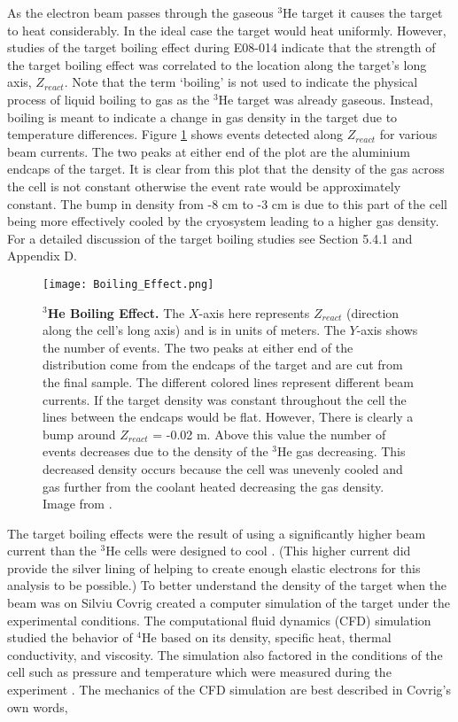 As the electron beam passes through the gaseous $^3$He target it causes the target to heat considerably. In the ideal case the target would heat uniformly. However, studies of the target boiling effect during E08-014 indicate that the strength of the target boiling effect was correlated to the location along the target's long axis, $Z_{react}$. Note that the term `boiling' is not used to indicate the physical process of liquid boiling to gas as the $^3$He target was already gaseous. Instead, boiling is meant to indicate a change in gas density in the target due to temperature differences. Figure \ref{fig:boiling_effect} shows events detected along $Z_{react}$ for various beam currents. The two peaks at either end of the plot are the aluminium endcaps of the target. It is clear from this plot that the density of the gas across the cell is not constant otherwise the event rate would be approximately constant. The bump in density from -8 cm to -3 cm is due to this part of the cell being more effectively cooled by the cryosystem leading to a higher gas density. For a detailed discussion of the target boiling studies see \cite{Thesis:Ye} Section 5.4.1 and Appendix D. 

\begin{figure}[!ht]
\begin{center}
\texttt{[image: Boiling\_Effect.png]}
\end{center}
\caption[$^3$He Boiling Effect]{
{\bf{$^3$He Boiling Effect.}} The $X$-axis here represents $Z_{react}$ (direction along the cell's long axis) and is in units of meters. The $Y$-axis shows the number of events. The two peaks at either end of the distribution come from the endcaps of the target and are cut from the final sample. The different colored lines represent different beam currents. If the target density was constant throughout the cell the lines between the endcaps would be flat. However, There is clearly a bump around $Z_{react}$ = -0.02 m. Above this value the number of events decreases due to the density of the $^3$He gas decreasing. This decreased density occurs because the cell was unevenly cooled and gas further from the coolant heated decreasing the gas density. Image from \cite{Thesis:Ye}.}
\label{fig:boiling_effect}
\end{figure}

The target boiling effects were the result of using a significantly higher beam current than the $^3$He cells were designed to cool \cite{dave}. (This higher current did provide the silver lining of helping to create enough elastic electrons for this analysis to be possible.) To better understand the density of the target when the beam was on Silviu Covrig created a computer simulation of the target under the experimental conditions. The computational fluid dynamics (CFD) simulation studied the behavior of $^4$He based on its density, specific heat, thermal conductivity, and viscosity. The simulation also factored in the conditions of the cell such as pressure and temperature which were measured during the experiment \cite{density}. The mechanics of the CFD simulation are best described in Covrig's own words, 

